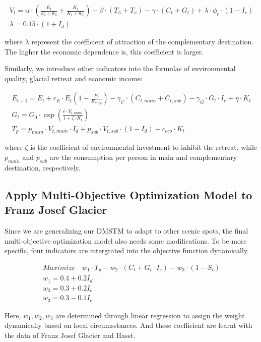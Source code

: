 \documentclass{mcmthesis}
\begin{document}
\begin{gather}
  V_t = \alpha \cdot \left(\frac{E_t}{E_t + \theta_E} + \frac{K_t}{K_t + \theta_K} \right) - \beta \cdot (T_h + T_v)
  - \gamma \cdot (C_t + G_t) + \lambda \cdot \phi_t \cdot (1 - I_c) \\
  \lambda = 0.15 \cdot (1 + I_d)
\end{gather}

where $\lambda$ represent the coefficient of attraction of the complementary destination. The higher the economic dependence is,
this coefficient is larger.

Similarly, we introduce other indicators into the formulas of environmental quality, glacial retreat and economic income:

\begin{gather}
  E_{t+1} = E_t + r_E \cdot E_t \left(1 - \frac{E_t}{E_{max}}\right) - \gamma_C \cdot (C_{t,main} + C_{t,sub}) - \gamma_G \cdot G_t \cdot I_e + \eta \cdot K_t \\
  G_t = G_0 \cdot \exp \left(\frac{\epsilon \cdot V_{t,main}}{1+\zeta \cdot K_t}\right) \\
  T_p = p_{main} \cdot V_{t,main} \cdot I_d + p_{sub} \cdot V_{t,sub} \cdot (1 - I_d) - c_{eco} \cdot K_t
\end{gather}

where $\zeta$ is the coefficient of environmental investment to inhibit the retreat, while 
$p_{main}$ and $p_{sub}$ are the consumption per person in main and complementary destination, respectively.

\subsection{Apply Multi-Objective Optimization Model to Franz Josef Glacier}
Since we are generalizing our DMSTM to adapt to other scenic spots, the final multi-objective optimization model
also needs some modifications. To be more specific, four indicators are intergrated into the objective function dynamically.

\begin{gather}
  Maximize \quad w_1\cdot T_p - w_2 \cdot (C_t + G_t \cdot I_e) - w_3 \cdot (1 - S_t) \\ 
  w_1 = 0.4 + 0.2I_d \\
  w_2 = 0.3 + 0.2I_e \\
  w_3 = 0.3 - 0.1I_e
\end{gather}

Here, $w_1, w_2, w_3$ are determined through linear regression to assign the weight dynamically based on local circumsstances.
And these coefficient are learnt with the data of Franz Josef Glacier and Hasst. 
\end{document}
